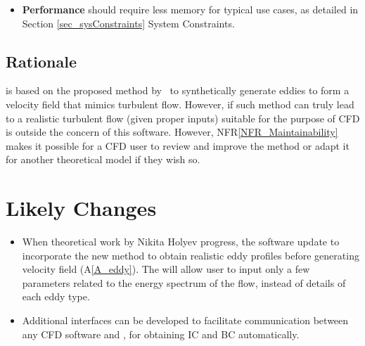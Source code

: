 \documentclass[12pt]{article}
\newcommand{\aref}[1]{A\ref{#1}}
\newcounter{nfrnum} %
\newcommand{\nfrref}[1]{NFR\ref{#1}}
\newcounter{lcnum} %
\begin{document}
\begin{itemize}

\item[NFR\refstepcounter{nfrnum}\thenfrnum \label{NFR_Performance}:]
  \textbf{Performance} \progname{} should require less memory for typical use cases, as detailed in Section \ref{sec_sysConstraints} System Constraints.

\end{itemize}

\subsection{Rationale}

\progname{} is based on the proposed method by~\citet{PolettoEtAl2013} to synthetically generate eddies to form a velocity field that mimics turbulent flow. However, if such method can truly lead to a realistic turbulent flow (given proper inputs) suitable for the purpose of CFD is outside the concern of this software. However, \nfrref{NFR_Maintainability} makes it possible for a CFD user to review and improve the method or adapt it for another theoretical model if they wish so. 


\section{Likely Changes}    

\noindent \begin{itemize}

\item[LC\refstepcounter{lcnum}\thelcnum\label{LC_realEddy}:] When theoretical work by Nikita Holyev progress, the software update to incorporate the new method to obtain realistic eddy profiles before generating velocity field (\aref{A_eddy}). The will allow user to input only a few parameters related to the energy spectrum of the flow, instead of details of each eddy type.
\item[LC\refstepcounter{lcnum}\thelcnum\label{LC_interface}:] Additional interfaces can be developed to facilitate communication between any CFD software and \progname, for obtaining IC and BC automatically.

\end{itemize}
\end{document}
